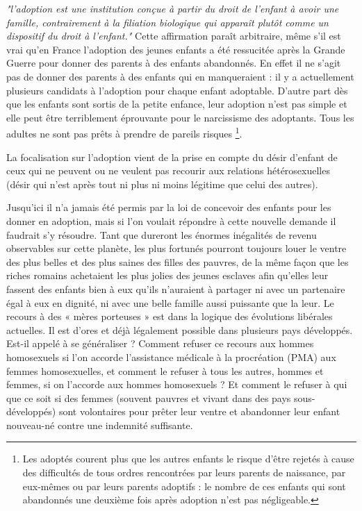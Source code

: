  \emph{"l'adoption est une institution conçue à partir du droit de l'enfant à avoir une famille, contrairement à la filiation biologique qui apparaît plutôt comme un dispositif du droit à l'enfant."} Cette affirmation paraît arbitraire, même s'il est vrai qu'en France l'adoption des jeunes enfants a été ressucitée après la Grande Guerre pour donner des parents à des enfants abandonnés. En effet il ne s'agit pas de donner des parents à des enfants qui en manqueraient : il y a actuellement plusieurs candidats à l'adoption pour chaque enfant adoptable. D'autre part dès que les enfants sont sortis de la petite enfance, leur adoption n'est pas simple  et elle peut être terriblement éprouvante pour le narcissisme des adoptants. Tous les adultes ne sont pas prêts à prendre de pareils risques \footnote{Les adoptés courent plus que les autres enfants le risque d'être rejetés à cause des difficultés de tous ordres rencontrées par leurs parents de naissance, par eux-mêmes ou par leurs parents adoptifs : le nombre de ces enfants qui sont abandonnés une deuxième fois après adoption n'est pas négligeable.}. 

La focalisation sur l'adoption vient de la prise en compte du désir d'enfant de ceux qui ne peuvent ou ne veulent pas recourir aux relations hétérosexuelles (désir qui n'est après tout ni plus ni moins légitime que celui des autres). 

Jusqu'ici il n'a jamais été permis par la loi de concevoir des enfants pour les donner en adoption, mais si l'on voulait répondre à cette nouvelle demande il faudrait s'y résoudre. Tant que dureront les énormes inégalités de revenu observables sur cette planète, les plus fortunés pourront toujours louer le ventre des plus belles et des plus saines des filles des pauvres, de la même façon que les riches romains achetaient les plus jolies des jeunes esclaves afin qu'elles leur fassent des enfants bien à eux qu'ils n'auraient à partager ni avec un partenaire égal à eux en dignité, ni avec une belle famille aussi puissante que la leur. Le recours à des « mères porteuses » est dans la logique des évolutions libérales actuelles. Il est d'ores et déjà légalement possible dans plusieurs pays développés. Est-il appelé à se généraliser ? Comment refuser ce recours aux hommes homosexuels si l'on accorde l'assistance médicale à la procréation (PMA) aux femmes homosexuelles, et comment le refuser à tous les autres, hommes et femmes, si on l'accorde aux hommes homosexuels ? Et comment le refuser à qui que ce soit si des femmes (souvent pauvres et vivant dans des pays sous-développés) sont volontaires pour prêter leur ventre et abandonner leur enfant nouveau-né contre une indemnité suffisante. 

